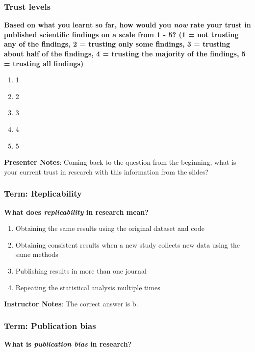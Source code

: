 \documentclass[
  english,
  letterpaper,
  DIV=11,
  numbers=noendperiod]{scrartcl}
\begin{document}
\subsubsection{Trust levels}

\textbf{Based on what you learnt so far, how would you \emph{now} rate
your trust in published scientific findings on a scale from 1 - 5? (1 =
not trusting any of the findings, 2 = trusting only some findings, 3 =
trusting about half of the findings, 4 = trusting the majority of the
findings, 5 = trusting all findings)}

\begin{enumerate}
\def\labelenumi{\alph{enumi}.}
\item
  1
\item
  2
\item
  3
\item
  4
\item
  5
\end{enumerate}

\textbf{Presenter Notes}: Coming back to the question from the
beginning, what is your current trust in research with this information
from the slides?

\subsubsection{Term: Replicability}

\textbf{What does \emph{replicability} in research mean?}

\begin{enumerate}
\def\labelenumi{\alph{enumi}.}
\item
  Obtaining the same results using the original dataset and code
\item
  Obtaining consistent results when a new study collects new data using
  the same methods
\item
  Publishing results in more than one journal
\item
  Repeating the statistical analysis multiple times
\end{enumerate}

\textbf{Instructor Notes}: The correct answer is b.

\subsubsection{Term: Publication bias}

\textbf{What is \emph{publication bias} in research?}
\end{document}
